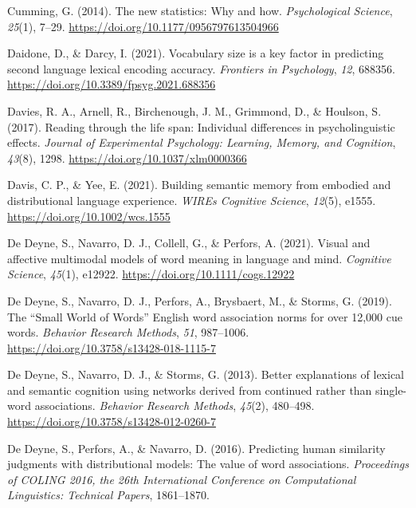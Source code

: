 \documentclass[
  12pt,
  man,floatsintext]{apa7}
\newlength{\cslhangindent}
\newlength{\cslentryspacingunit} %
\newenvironment{CSLReferences}[2] %
 {%
  \setlength{\parindent}{0pt}
  \ifodd #1
  \let\oldpar\par
  \def\par{\hangindent=\cslhangindent\oldpar}
  \fi
  \setlength{\parskip}{#2\cslentryspacingunit}
 }%
 {}
\begin{document}
\begin{CSLReferences}{1}{0}
\leavevmode{}%
Cumming, G. (2014). The new statistics: {Why} and how. \emph{Psychological Science}, \emph{25}(1), 7--29. \url{https://doi.org/10.1177/0956797613504966}

\leavevmode{}%
Daidone, D., \& Darcy, I. (2021). Vocabulary size is a key factor in predicting second language lexical encoding accuracy. \emph{Frontiers in Psychology}, \emph{12}, 688356. \url{https://doi.org/10.3389/fpsyg.2021.688356}

\leavevmode{}%
Davies, R. A., Arnell, R., Birchenough, J. M., Grimmond, D., \& Houlson, S. (2017). Reading through the life span: {Individual} differences in psycholinguistic effects. \emph{Journal of Experimental Psychology: Learning, Memory, and Cognition}, \emph{43}(8), 1298. \url{https://doi.org/10.1037/xlm0000366}

\leavevmode{}%
Davis, C. P., \& Yee, E. (2021). Building semantic memory from embodied and distributional language experience. \emph{WIREs Cognitive Science}, \emph{12}(5), e1555. \url{https://doi.org/10.1002/wcs.1555}

\leavevmode{}%
De Deyne, S., Navarro, D. J., Collell, G., \& Perfors, A. (2021). Visual and affective multimodal models of word meaning in language and mind. \emph{Cognitive Science}, \emph{45}(1), e12922. \url{https://doi.org/10.1111/cogs.12922}

\leavevmode{}%
De Deyne, S., Navarro, D. J., Perfors, A., Brysbaert, M., \& Storms, G. (2019). The {``{Small World} of {Words}''} {English} word association norms for over 12,000 cue words. \emph{Behavior Research Methods}, \emph{51}, 987--1006. \url{https://doi.org/10.3758/s13428-018-1115-7}

\leavevmode{}%
De Deyne, S., Navarro, D. J., \& Storms, G. (2013). Better explanations of lexical and semantic cognition using networks derived from continued rather than single-word associations. \emph{Behavior Research Methods}, \emph{45}(2), 480--498. \url{https://doi.org/10.3758/s13428-012-0260-7}

\leavevmode{}%
De Deyne, S., Perfors, A., \& Navarro, D. (2016). Predicting human similarity judgments with distributional models: {The} value of word associations. \emph{Proceedings of {COLING} 2016, the 26th International Conference on Computational Linguistics: {Technical} Papers}, 1861--1870.


\end{CSLReferences}
\end{document}
